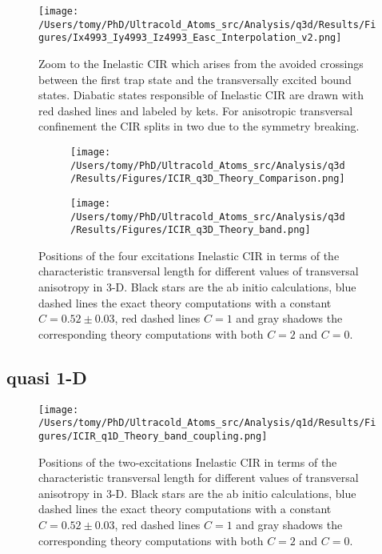 \documentclass[aps,pre,twocolumn,superscriptaddress,showpacs]{revtex4-1}
\begin{document}
	\begin{figure}[h]
   	 \centering
    	\texttt{[image: /Users/tomy/PhD/Ultracold\_Atoms\_src/Analysis/q3d/Results/Figures/Ix4993\_Iy4993\_Iz4993\_Easc\_Interpolation\_v2.png]}
    	\caption{Zoom to the Inelastic CIR which arises from the avoided crossings between the first trap state and the transversally excited bound states. Diabatic states responsible of Inelastic CIR are drawn with red dashed lines and labeled by kets. For anisotropic transversal confinement the CIR splits in two due to the symmetry breaking.}
    	\label{fig:Isotropic Crossings}
	\end{figure}
	
	\begin{figure}[H]
	 \begin{subfigure}{0.5\textwidth}
	  \centering
	 \texttt{[image: /Users/tomy/PhD/Ultracold\_Atoms\_src/Analysis/q3d/Results/Figures/ICIR\_q3D\_Theory\_Comparison.png]}
	 \end{subfigure}
	 \vspace{10pt}
	 \begin{subfigure}{0.5\textwidth}
	   \centering
    	 \texttt{[image: /Users/tomy/PhD/Ultracold\_Atoms\_src/Analysis/q3d/Results/Figures/ICIR\_q3D\_Theory\_band.png]}
	 \end{subfigure}
    	\caption{Positions of the four excitations Inelastic CIR in terms of the characteristic transversal length for different values of transversal anisotropy in 3-D. Black stars are the ab initio calculations, blue dashed lines the exact theory computations with a constant $C=0.52\pm0.03$, red dashed lines $C=1$ and gray shadows the corresponding theory computations with both $C=2$ and $C=0$. }
    	\label{fig:q3d ICIR}
	\end{figure}
	

\subsection{quasi 1-D}
\begin{figure}[H]
   	 \centering
    	\texttt{[image: /Users/tomy/PhD/Ultracold\_Atoms\_src/Analysis/q1d/Results/Figures/ICIR\_q1D\_Theory\_band\_coupling.png]}
    	\caption{Positions of the two-excitations Inelastic CIR in terms of the characteristic transversal length for different values of transversal anisotropy in 3-D. Black stars are the ab initio calculations, blue dashed lines the exact theory computations with a constant $C=0.52\pm0.03$, red dashed lines $C=1$ and gray shadows the corresponding theory computations with both $C=2$ and $C=0$.}
    	\label{fig:q1D ICIR}
	\end{figure}
\end{document}
